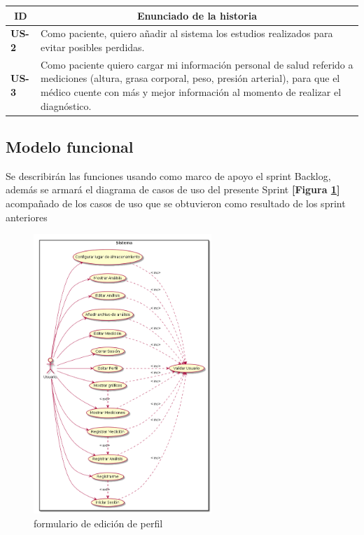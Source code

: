\documentclass[a4paper,12pt]{article}
\begin{document}
\begin{table}[h]

    \centering
	\begin{tabular}{|l|p{9cm}|}
	\hline
        \multicolumn{1}{|c|}{\textbf{ID}} &
        \multicolumn{1}{c|}{\textbf{Enunciado de la historia}} \\          
    \hline
        \textbf{US-2 } & Como paciente, quiero añadir al sistema los estudios realizados para evitar posibles perdidas.\\
    \hline
    	\textbf{US-3} & Como paciente quiero cargar mi información personal de salud referido a mediciones (altura, grasa corporal, peso, presión arterial), para que el médico cuente con más y mejor información al momento de realizar el diagnóstico.\\
    \hline
    \end{tabular}
    \label{US-Sprint6}
\end{table}

\subsection{Modelo funcional} %
Se describirán las funciones usando como marco de apoyo el sprint Backlog, además se armará el diagrama de casos de uso del presente Sprint \textbf{[Figura \ref{6-cu}]} acompañado de los casos de uso que se obtuvieron como resultado de los sprint anteriores



\begin{figure}[h]
	\centering
	\includegraphics[width=0.6\textwidth]{img/6-cu}
	\caption{formulario de edición de perfil}
	\label{6-cu}
\end{figure}
\end{document}
